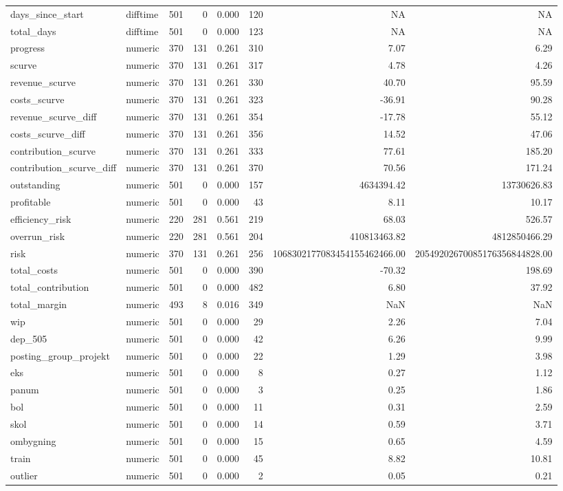 \begin{landscape}
\begin{longtable}[t]{llrrrrrr}
days\_since\_start & difftime & 501 & 0 & 0.000 & 120 & NA & NA\\
total\_days & difftime & 501 & 0 & 0.000 & 123 & NA & NA\\
progress & numeric & 370 & 131 & 0.261 & 310 & 7.07 & 6.29\\
scurve & numeric & 370 & 131 & 0.261 & 317 & 4.78 & 4.26\\
revenue\_scurve & numeric & 370 & 131 & 0.261 & 330 & 40.70 & 95.59\\
costs\_scurve & numeric & 370 & 131 & 0.261 & 323 & -36.91 & 90.28\\
revenue\_scurve\_diff & numeric & 370 & 131 & 0.261 & 354 & -17.78 & 55.12\\
costs\_scurve\_diff & numeric & 370 & 131 & 0.261 & 356 & 14.52 & 47.06\\
contribution\_scurve & numeric & 370 & 131 & 0.261 & 333 & 77.61 & 185.20\\
contribution\_scurve\_diff & numeric & 370 & 131 & 0.261 & 370 & 70.56 & 171.24\\
outstanding & numeric & 501 & 0 & 0.000 & 157 & 4634394.42 & 13730626.83\\
profitable & numeric & 501 & 0 & 0.000 & 43 & 8.11 & 10.17\\
efficiency\_risk & numeric & 220 & 281 & 0.561 & 219 & 68.03 & 526.57\\
overrun\_risk & numeric & 220 & 281 & 0.561 & 204 & 410813463.82 & 4812850466.29\\
risk & numeric & 370 & 131 & 0.261 & 256 & 1068302177083454155462466.00 & 20549202670085176356844828.00\\
total\_costs & numeric & 501 & 0 & 0.000 & 390 & -70.32 & 198.69\\
total\_contribution & numeric & 501 & 0 & 0.000 & 482 & 6.80 & 37.92\\
total\_margin & numeric & 493 & 8 & 0.016 & 349 & NaN & NaN\\
wip & numeric & 501 & 0 & 0.000 & 29 & 2.26 & 7.04\\
dep\_505 & numeric & 501 & 0 & 0.000 & 42 & 6.26 & 9.99\\
posting\_group\_projekt & numeric & 501 & 0 & 0.000 & 22 & 1.29 & 3.98\\
eks & numeric & 501 & 0 & 0.000 & 8 & 0.27 & 1.12\\
panum & numeric & 501 & 0 & 0.000 & 3 & 0.25 & 1.86\\
bol & numeric & 501 & 0 & 0.000 & 11 & 0.31 & 2.59\\
skol & numeric & 501 & 0 & 0.000 & 14 & 0.59 & 3.71\\
ombygning & numeric & 501 & 0 & 0.000 & 15 & 0.65 & 4.59\\
train & numeric & 501 & 0 & 0.000 & 45 & 8.82 & 10.81\\
outlier & numeric & 501 & 0 & 0.000 & 2 & 0.05 & 0.21\\*
\end{longtable}
\end{landscape}
\endgroup{}
